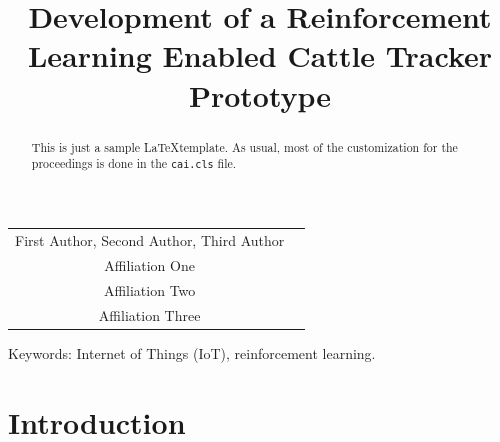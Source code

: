 \documentclass[10pt]{cai}
\begin{document}
\def\conferenceyear{2025}
\begin{center}

\title{Development of a Reinforcement Learning Enabled Cattle Tracker Prototype}
\maketitle

\thispagestyle{empty}

\begin{tabular}{cc}
First Author\upstairs{\affilone,*}, Second Author\upstairs{\affilone}, Third Author\upstairs{\affilthree}
\\[0.25ex]
{\small \upstairs{\affilone} Affiliation One} \\
{\small \upstairs{\affiltwo} Affiliation Two} \\
{\small \upstairs{\affilthree} Affiliation Three} \\
\end{tabular}
  
\vspace*{0.2in}
\end{center}

\begin{abstract}
This is just a sample \LaTeX template. As usual, most of the customization for the proceedings is done in the \texttt{cai.cls} file. 
\end{abstract}

\begin{keywords}{Keywords:}
Internet of Things (IoT), reinforcement learning.
\end{keywords}
\copyrightnotice

\section{Introduction}
\end{document}
